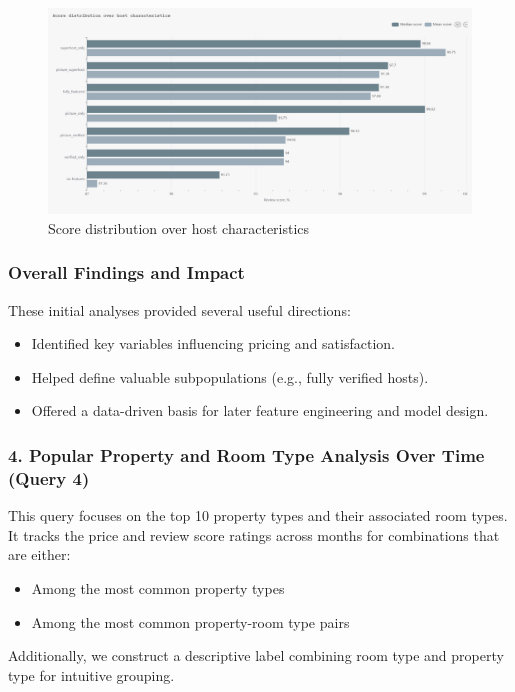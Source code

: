 \vspace{1em}
\begin{figure}[H]
    \centering
    \includegraphics[width=1\textwidth]{images/q3_1.jpg}
    \caption{Score distribution over host characteristics}
    \label{fig:figureq4}
\end{figure}
\subsubsection*{Overall Findings and Impact}

These initial analyses provided several useful directions:
\begin{itemize}
    \item Identified key variables influencing pricing and satisfaction.
    \item Helped define valuable subpopulations (e.g., fully verified hosts).
    \item Offered a data-driven basis for later feature engineering and model design.
\end{itemize}

\subsubsection*{4. Popular Property and Room Type Analysis Over Time (Query 4)}

This query focuses on the top 10 property types and their associated room types. It tracks the price and review score ratings across months for combinations that are either:
\begin{itemize}
    \item Among the most common property types
    \item Among the most common property-room type pairs
\end{itemize}

Additionally, we construct a descriptive label combining room type and property type for intuitive grouping.


